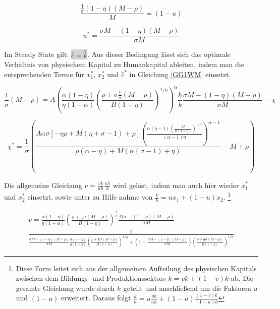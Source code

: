 	
	\begin{equation*}
		\frac{\frac{1}{\sigma}(1-\eta)(M-\rho)}{M}=(1-u)
	\end{equation*}

	
	\begin{equation}
		\boxed{u^*=\frac{\sigma M-(1-\eta)(M-\rho)}{\sigma M}}
	\end{equation}


Im Steady State gilt: \colorbox{lightgray}{$\hat{c}=\hat{k}$}. Aus dieser Bedingung lässt sich das optimale Verhältnis von physischem Kapital zu Humankapital ableiten, indem man die entsprechenden Terme für $x_1^*$, $x_2^*$ und $\hat{c}^*$  in Gleichung \eqref{GG1WM} einsetzt. 

	\begin{equation*}
		\frac{1}{\sigma} (M-\rho)=A\left(\frac{\alpha(1-\eta)}{\eta(1-\alpha)}\left(\frac{\rho+\sigma\frac{1}{\sigma} (M-\rho)}{B(1-\eta)}\right)^{1/\eta}\right)^{\alpha}\frac{h}{k}\frac{\sigma M-(1-\eta)(M-\rho)}{\sigma M}-\chi
	\end{equation*}


	\begin{equation}
		\boxed{\chi^*=\frac{1}{\sigma}\left(\frac{A\alpha \sigma[-\eta\rho+M(\eta+\sigma-1)+\rho] \left(\frac{\alpha  (\eta -1) \left(\frac{M}{B (1-\eta) }\right)^{1/\eta }}{(\alpha -1) \eta }\right)^{\alpha -1}}{\rho  (\alpha -\eta )+M (\alpha  (\sigma -1)+\eta )}-M+\rho\right)}
	\end{equation}


Die allgemeine Gleichung $v=\frac{vk}{uh}\frac{uh}{k}$ wird gelöst, indem man auch hier wieder $x_1^*$ und $x_2^*$ einsetzt, sowie unter zu Hilfe nahme von $\frac{k}{h}=u x_1+(1-u)x_2$. \footnote{Diese Form leitet sich aus der allgemeinen Aufteilung des physischen Kapitals zwischen dem Bildungs- und Produktionssektors $k=vk+(1-v)k$ ab. Die gesamte Gleichung wurde durch $h$ geteilt und anschlie{\ss}end um die Faktoren $u$ und $(1-u)$ erweitert. Daraus folgt $\frac{k}{h}=u\frac{vk}{uh}+(1-u)\frac{(1-v)k}{(1-u)h}$}


	\begin{equation}
		\begin{split}
			v=\frac{\alpha(1-\eta)}{\eta(1-\alpha)} \left(\frac{\rho+\frac{1}{\sigma} \sigma(M-\rho)}{B (1-\eta )}\right)^{\frac{1}{\eta}} \frac{M \sigma -(1-\eta ) (M-\rho )}{ \sigma M}\\
			\frac{1}{\frac{ \sigma M -(1-\eta ) (M-\rho )}{\sigma M }\frac{\alpha(1-\eta)}{\eta(1-\alpha)}\left(\frac{\rho+\frac{1}{\sigma}\sigma(M-\rho )}{B (1-\eta )}\right)^{1/\eta }+\left(1-\frac{ \sigma M-(1-\eta ) (M-\rho )}{ \sigma M}\right) \left(\frac{\rho+\frac{1}{\sigma}\sigma(M-\rho )}{B (1-\eta )}\right)^{1/\eta }}
		\end{split}
	\end{equation}


